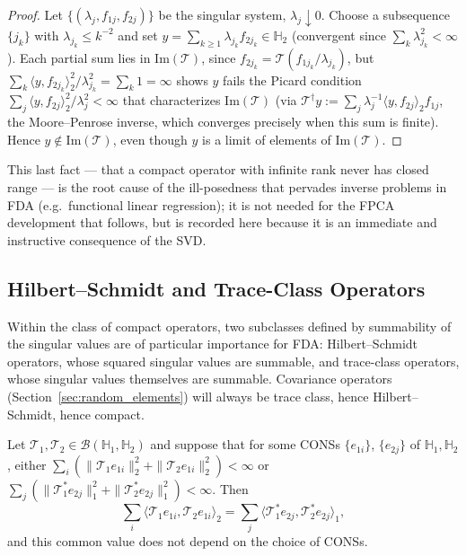 \begin{proof}
Let $\{(\lambda_j,f_{1j},f_{2j})\}$ be the singular system, $\lambda_j
\downarrow 0$. Choose a subsequence $\{j_k\}$ with $\lambda_{j_k}\leq
k^{-2}$ and set $y=\sum_{k\geq 1}\lambda_{j_k}f_{2j_k}\in\mathbb{H}_2$
(convergent since $\sum_k\lambda_{j_k}^2<\infty$). Each partial sum lies in
$\mathrm{Im}(\mathcal{T})$, since $f_{2j_k}=\mathcal{T}(f_{1j_k}/
\lambda_{j_k})$, but $\sum_k\langle y,f_{2j_k}\rangle_2^2/\lambda_{j_k}^2 =
\sum_k 1 = \infty$ shows $y$ fails the Picard condition
$\sum_j\langle y,f_{2j}\rangle_2^2/\lambda_j^2<\infty$ that characterizes
$\mathrm{Im}(\mathcal{T})$ (via $\mathcal{T}^\dagger y :=
\sum_j\lambda_j^{-1}\langle y,f_{2j}\rangle_2 f_{1j}$, the Moore--Penrose
inverse, which converges precisely when this sum is finite). Hence
$y\notin\mathrm{Im}(\mathcal{T})$, even though $y$ is a limit of elements
of $\mathrm{Im}(\mathcal{T})$.
\end{proof}

This last fact --- that a compact operator with infinite rank never has
closed range --- is the root cause of the ill-posedness that pervades
inverse problems in FDA (e.g.\ functional linear regression); it is not
needed for the FPCA development that follows, but is recorded here because
it is an immediate and instructive consequence of the SVD.

\subsection{Hilbert--Schmidt and Trace-Class Operators}
\label{subsec:hs_trace}

Within the class of compact operators, two subclasses defined by summability
of the singular values are of particular importance for FDA: Hilbert--Schmidt
operators, whose squared singular values are summable, and trace-class
operators, whose singular values themselves are summable. Covariance
operators (Section~\ref{sec:random_elements}) will always be trace class,
hence Hilbert--Schmidt, hence compact.

\begin{theorem}
\label{thm:hs_cons_independence}
Let $\mathcal{T}_1,\mathcal{T}_2\in\mathcal{B}(\mathbb{H}_1,\mathbb{H}_2)$
and suppose that for some CONSs $\{e_{1i}\}$, $\{e_{2j}\}$ of
$\mathbb{H}_1,\mathbb{H}_2$, either $\sum_i(\|\mathcal{T}_1e_{1i}\|_2^2+
\|\mathcal{T}_2e_{1i}\|_2^2)<\infty$ or $\sum_j(\|\mathcal{T}_1^*e_{2j}
\|_1^2+\|\mathcal{T}_2^*e_{2j}\|_1^2)<\infty$. Then
\begin{equation}
\sum_i\langle\mathcal{T}_1e_{1i},\mathcal{T}_2e_{1i}\rangle_2 =
\sum_j\langle\mathcal{T}_1^*e_{2j},\mathcal{T}_2^*e_{2j}\rangle_1,
\label{eq:hs_polarization}
\end{equation}
and this common value does not depend on the choice of CONSs.
\end{theorem}

